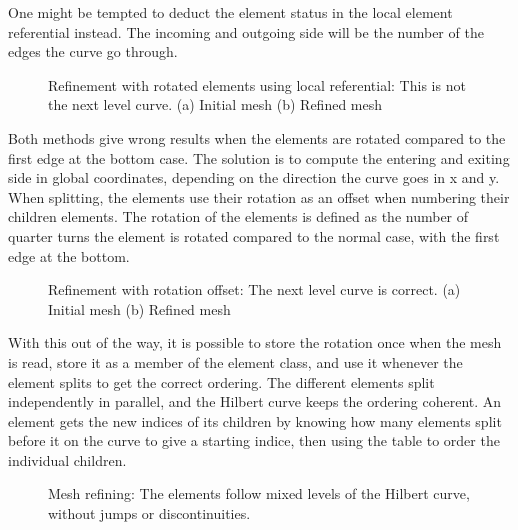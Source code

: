 One might be tempted to deduct the element status in the local element referential instead. The
incoming and outgoing side will be the number of the edges the curve go through. 

\begin{figure}[H]
	\centering
	\hfill
	\caption{Refinement with rotated elements using local referential: This is not the next level curve. (a) Initial mesh (b) Refined mesh}
	\label{fig:hilbert_local}
\end{figure}

Both methods give wrong results when the elements are rotated compared to the first edge at the
bottom case. The solution is to compute the entering and exiting side in global coordinates,
depending on the direction the curve goes in x and y. When splitting, the elements use their
rotation as an offset when numbering their children elements. The rotation of the elements is
defined as the number of quarter turns the element is rotated compared to the normal case, with the
first edge at the bottom.

\begin{figure}[H]
	\centering
	\hfill
	\caption{Refinement with rotation offset: The next level curve is correct. (a) Initial mesh (b) Refined mesh}
	\label{fig:hilbert_correct}
\end{figure}

With this out of the way, it is possible to store the rotation once when the mesh is read, store it
as a member of the element class, and use it whenever the element splits to get the correct
ordering. The different elements split independently in parallel, and the Hilbert curve keeps the
ordering coherent. An element gets the new indices of its children by knowing how many elements
split before it on the curve to give a starting indice, then using the table to order the individual
children.

\begin{figure}[H]
	\centering
	
	\caption{Mesh refining: The elements follow mixed levels of the Hilbert curve, without jumps or discontinuities.}
	\label{fig:mesh_1_after2}
\end{figure}

